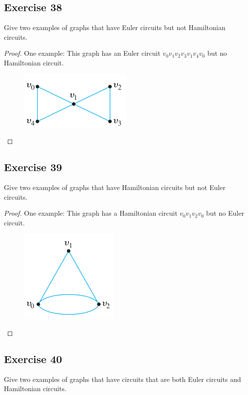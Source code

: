 \documentclass[14pt]{extarticle}
\begin{document}
\subsection{Exercise 38}
Give two examples of graphs that have Euler circuits but not Hamiltonian circuits.

\begin{proof}
One example: This graph has an Euler circuit \(v_0v_1v_2v_3v_1v_4v_0\) but no Hamiltonian circuit.

\begin{figure}[ht!]
\centering
\includegraphics[scale=0.6]{../images/10.1.38.png}
\end{figure}
\end{proof}

\subsection{Exercise 39}
Give two examples of graphs that have Hamiltonian circuits but not Euler circuits.

\begin{proof}
One example: This graph has a Hamiltonian circuit \(v_0v_1v_2v_0\) but no Euler circuit.

\begin{figure}[ht!]
\centering
\includegraphics[scale=0.6]{../images/10.1.39.png}
\end{figure}
\end{proof}

\subsection{Exercise 40}
Give two examples of graphs that have circuits that are both Euler circuits and Hamiltonian circuits.
\end{document}

